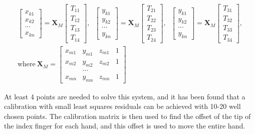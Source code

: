 \begin{gather*}
    \begin{bmatrix}
        x_{k1} \\
        x_{k2} \\
        \cdots \\
        x_{kn}
    \end{bmatrix}
    =
    \mathbf{X}_M
    \begin{bmatrix}
        T_{11} \\
        T_{12} \\
        T_{13} \\
        T_{14}
    \end{bmatrix}
    ,\;\;
    \begin{bmatrix}
        y_{k1} \\
        y_{k2} \\
        \cdots \\
        y_{kn}
    \end{bmatrix}
    =
    \mathbf{X}_M
    \begin{bmatrix}
        T_{21} \\
        T_{22} \\
        T_{23} \\
        T_{24}
    \end{bmatrix}
    ,\;\;
    \begin{bmatrix}
        y_{k1} \\
        y_{k2} \\
        \cdots \\
        y_{kn}
    \end{bmatrix}
    =
    \mathbf{X}_M
    \begin{bmatrix}
        T_{31} \\
        T_{32} \\
        T_{33} \\
        T_{34}
    \end{bmatrix}
    ,\\
    \text{where}~\mathbf{X}_M =
    \begin{bmatrix}
        x_{m1} & y_{m1} & z_{m1} & 1 \\
        x_{m2} & y_{m2} & z_{m2} & 1 \\
        &\dots & & \\
        x_{mn} & y_{mn} & z_{mn} & 1
    \end{bmatrix}
\end{gather*}

At least 4 points are needed to solve this system, and it has been found that a calibration with small least squares residuals can be achieved with 10-20 well chosen points.
The calibration matrix is then used to find the offset of the tip of the index finger for each hand, and this offset is used to move the entire hand.

